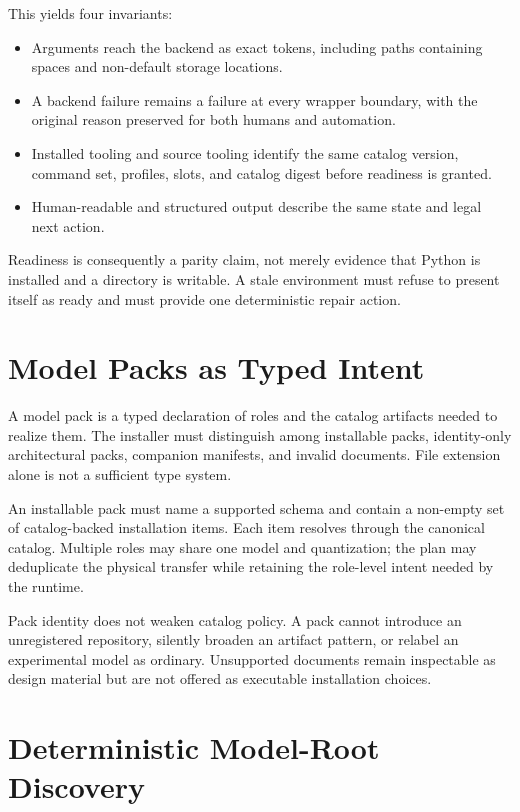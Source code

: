 \documentclass[11pt]{article}
\begin{document}
This yields four invariants:

\begin{itemize}[leftmargin=*]
  \item Arguments reach the backend as exact tokens, including paths containing
  spaces and non-default storage locations.
  \item A backend failure remains a failure at every wrapper boundary, with the
  original reason preserved for both humans and automation.
  \item Installed tooling and source tooling identify the same catalog version,
  command set, profiles, slots, and catalog digest before readiness is granted.
  \item Human-readable and structured output describe the same state and legal
  next action.
\end{itemize}

Readiness is consequently a parity claim, not merely evidence that Python is
installed and a directory is writable. A stale environment must refuse to
present itself as ready and must provide one deterministic repair action.

\section{Model Packs as Typed Intent}

A model pack is a typed declaration of roles and the catalog artifacts needed
to realize them. The installer must distinguish among installable packs,
identity-only architectural packs, companion manifests, and invalid documents.
File extension alone is not a sufficient type system.

An installable pack must name a supported schema and contain a non-empty set of
catalog-backed installation items. Each item resolves through the canonical
catalog. Multiple roles may share one model and quantization; the plan may
deduplicate the physical transfer while retaining the role-level intent needed
by the runtime.

Pack identity does not weaken catalog policy. A pack cannot introduce an
unregistered repository, silently broaden an artifact pattern, or relabel an
experimental model as ordinary. Unsupported documents remain inspectable as
design material but are not offered as executable installation choices.

\section{Deterministic Model-Root Discovery}
\end{document}
